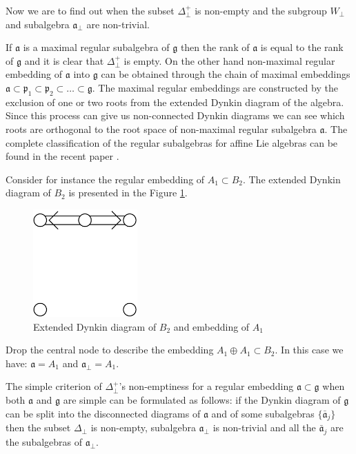 \documentclass[a4paper,12pt]{article}
\theoremstyle{definition} \newtheorem{Def}{Definition}
\begin{document}
Now we are to find out when the subset $\Delta^{+}_{\bot}$ is non-empty
and the subgroup $W_{\bot}$ and subalgebra $\mathfrak{a}_{\bot}$ are non-trivial.

If $\mathfrak{a}$ is a maximal regular subalgebra of $\mathfrak{g}$ then
the rank of $\mathfrak{a}$ is equal to the rank of $\mathfrak{g}$ and
it is clear that $\Delta^{+}_{\bot}$ is empty.
On the other hand
non-maximal regular embedding of $\mathfrak{a}$ into $\mathfrak{g}$ can be obtained
through the chain of maximal embeddings
$\mathfrak{a}\subset \mathfrak{p}_1\subset \mathfrak{p}_2\subset\dots \subset \mathfrak{g}$.
The maximal regular embeddings are constructed by the exclusion of one or two roots
from the extended Dynkin diagram of the algebra. Since this process can give us
non-connected Dynkin diagrams we can see which roots are orthogonal to the root
space of non-maximal regular subalgebra $\mathfrak{a}$.  The complete classification of the regular subalgebras for affine Lie algebras can be found in the recent paper \cite{1751-8121-41-36-365204}.

Consider for instance the regular embedding of $A_1\subset B_2$.
The extended Dynkin diagram of $B_2$ is presented in the Figure \ref{fig:B2Dynkin}.
\begin{figure}[ph]
  \centering
  \includegraphics[width=40mm]{B2_A1_diagram.pdf}
  \caption{Extended Dynkin diagram of $B_2$ and embedding of $A_1$}
  \label{fig:B2Dynkin}
\end{figure}
Drop the central node to describe the embedding $A_1\oplus A_1\subset B_2$.
In this case we have: $\mathfrak{a}=A_1$ and $\mathfrak{a}_{\bot}=A_1$.

The simple criterion of $\Delta^{+}_{\bot}$'s non-emptiness for a regular
embedding $\mathfrak{a}\subset \mathfrak{g}$
when both $\mathfrak{a}$ and $\mathfrak{g}$ are simple can be formulated
as follows:
if the Dynkin diagram of $\mathfrak{g}$ can be split into the disconnected
diagrams of $\mathfrak{a}$ and of some subalgebras $\{\mathfrak{\bar{a}}_j\}$
then the subset $\Delta_{\bot}$ is non-empty,
subalgebra $\mathfrak{a}_{\bot}$ is non-trivial and all the
$\mathfrak{\bar{a}}_j$ are the subalgebras of $\mathfrak{a}_{\bot}$.
\end{document}
